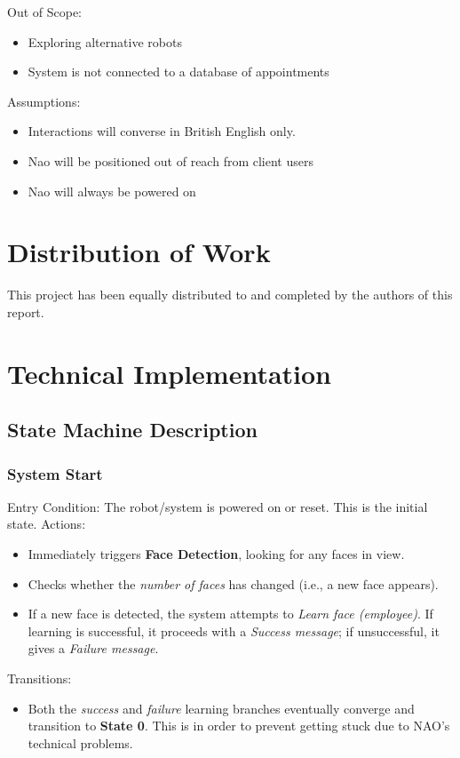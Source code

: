 \documentclass[conference]{IEEEtran}
\begin{document}
Out of Scope:
\begin{itemize}
        \item Exploring alternative robots
        \item System is not connected to a database of appointments 
\end{itemize}

Assumptions:
\begin{itemize}
        \item Interactions will converse in British English only.
        \item Nao will be positioned out of reach from client users
        \item Nao will always be powered on
\end{itemize}

\section{Distribution of Work} This project has been equally distributed to and completed by the authors of this report.

\section{Technical Implementation}

\subsection{State Machine Description}

\subsubsection{System Start}
Entry Condition:
The robot/system is powered on or reset. This is the initial state.
Actions:
\begin{itemize}
  \item Immediately triggers \textbf{Face Detection}, looking for any faces in view.
  \item Checks whether the \emph{number of faces} has changed (i.e., a new face appears).
  \item If a new face is detected, the system attempts to \emph{Learn face (employee)}. If learning is successful, it proceeds with a \emph{Success message}; if unsuccessful, it gives a \emph{Failure message}.
\end{itemize}
Transitions:
\begin{itemize}
  \item Both the \emph{success} and \emph{failure} learning branches eventually converge and transition to \textbf{State 0}. This is in order to prevent getting stuck due to NAO's technical problems.
\end{itemize}
\end{document}

